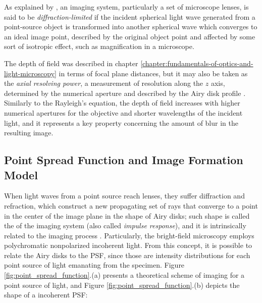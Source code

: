 As explained by , an imaging system, particularly a set of microscope lenses, is said to be \emph{diffraction-limited} if the incident spherical light wave generated from a point-source object is transformed into another spherical wave which converges to an ideal image point, described by the original object point and affected by some sort of isotropic effect, such as magnification in a microscope.

The depth of field was described in chapter \ref{chapter:fundamentals-of-optics-and-light-microscopy} in terms of focal plane distances, but it may also be taken as the \emph{axial resolving power}, a measurement of resolution along the $z$ axis, determined by the numerical aperture and described by the Airy disk profile \cite{davidson2002optical}. Similarly to the Rayleigh's equation, the depth of field increases
with higher numerical apertures for the objective and shorter wavelengths of the incident light, and it represents a key property concerning the amount of blur in the resulting image.


\subsection{Point Spread Function and Image Formation Model}

\label{sec:point_spread_function_and_image_formation_model}

When light waves from a point source reach lenses, they suffer diffraction and refraction, which construct a new propagating set of rays that converge to a point in the center of the image plane in the shape of Airy disks; such shape is called the 
of the imaging system (also called \emph{impulse response}), and it is intrinsically related to the imaging process \cite{wu2008microscope}. Particularly, the bright-field microscopy employs polychromatic nonpolarized incoherent light. From this concept, it is possible to relate the Airy disks to the PSF, since those are intensity distributions for each point source of light emanating from the specimen. Figure \ref{fig:point_spread_function}.(a) presents a theoretical scheme of imaging for a point source of light, and Figure \ref{fig:point_spread_function}.(b) depicts the shape of a incoherent PSF:

